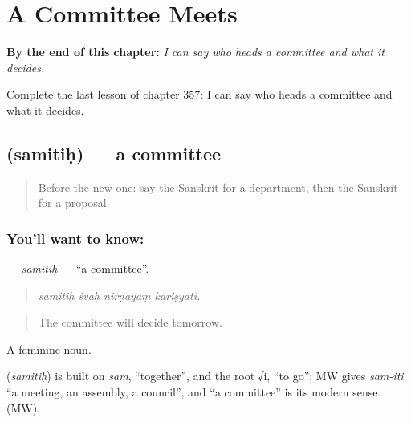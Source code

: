 
\chapter{A Committee Meets}
\label{ch:sa-a-committee-meets}

\begin{chapteropening}
\textbf{By the end of this chapter:} \emph{I can say who heads a committee and what it decides.}

Complete the last lesson of chapter 357: I can say who heads a committee and what it decides.
\end{chapteropening}

\section[\texorpdfstring{\sk{समितिः} (samitiḥ)}{समितिः (samitiḥ)}]{ (samitiḥ) — a committee}

\label{lesson:SA-C357-samitih}



\begin{quote}
Before the new one: say the Sanskrit for a department, then the Sanskrit for a proposal.
\end{quote}

\subsection*{You'll want to know: }
\textbf{} — \emph{samitiḥ} — \textquotedblleft{}a committee\textquotedblright{}.

\begin{quote}
   
\end{quote}

\begin{quote}
\emph{samitiḥ śvaḥ nirṇayaṃ kariṣyati.}
\end{quote}

\begin{quote}
The committee will decide tomorrow.
\end{quote}

A feminine noun.

\begin{cousinweb}
\textbf{} (\emph{samitiḥ}) is built on \emph{sam}, \textquotedblleft{}together\textquotedblright{}, and the root √i, \textquotedblleft{}to go\textquotedblright{}; MW gives \emph{sam-iti} \textquotedblleft{}a meeting, an assembly, a council\textquotedblright{}, and \textquotedblleft{}a committee\textquotedblright{} is its modern sense (MW).
\end{cousinweb}

